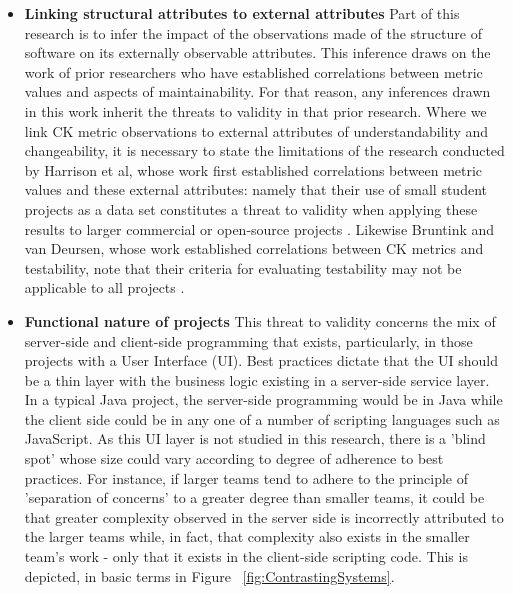 \begin{itemize}
\item  \textbf{Linking structural attributes to external attributes} Part of this research is to infer the impact of the observations made of the structure of software on its externally observable attributes. This inference draws on the work of prior researchers who have established correlations between metric values and aspects of maintainability. For that reason, any inferences drawn in this work inherit the threats to validity in that prior research. Where we link CK metric observations to external attributes of understandability and changeability, it is necessary to state the limitations of the research conducted by Harrison et al, whose work first established correlations between metric values and these external attributes: namely that their use of small student projects as a data set constitutes a threat to validity when applying these results to larger commercial or open-source projects \citep{harrison1998investigation}. Likewise Bruntink and van Deursen, whose work established correlations between CK metrics and testability, note that their criteria for evaluating testability may not be applicable to all projects \citep{bruntink2006empirical}.

\item  \textbf{Functional nature of projects} This threat to validity concerns the mix of server-side and client-side programming that exists, particularly, in those projects with a User Interface (UI). Best practices dictate that the UI should be a thin layer with the business logic existing in a server-side service layer. In a typical Java project, the server-side programming would be in Java while the client side could be in any one of a number of scripting languages such as JavaScript. As this UI layer is not studied in this research, there is a 'blind spot' whose size could vary according to degree of adherence to best practices. For instance, if larger teams tend to adhere to the principle of 'separation of concerns' to a greater degree than smaller teams, it could be that greater complexity observed in the server side is incorrectly attributed to the larger teams while, in fact, that complexity also exists in the smaller team's work - only that it exists in the client-side scripting code. This is depicted, in basic terms in Figure ~\ref{fig:ContrastingSystems}.


\end{itemize}
